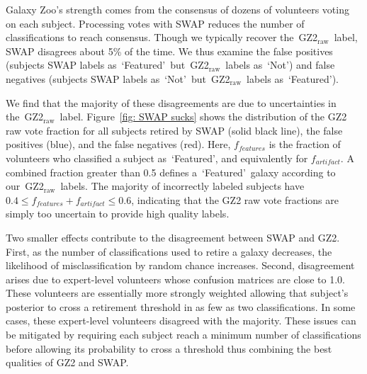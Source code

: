 \documentclass[twocolumn]{aastex6}
\newcommand{\feat}{`Featured'}
\newcommand{\notfeat}{`Not'}
\newcommand{\raw}{GZ2$_{\text{raw}}$}
\begin{document}
Galaxy Zoo's strength comes from the consensus of dozens of volunteers voting on each subject. 
Processing votes with SWAP reduces the number of classifications to reach consensus. 
Though we typically recover the~\raw~label, SWAP disagrees about 5\% of the time. 
We thus examine the false positives (subjects SWAP labels as~\feat~but~\raw~labels as~\notfeat) and false negatives (subjects SWAP labels as~\notfeat~but~\raw~labels as~\feat).


We find that the majority of these disagreements are due to uncertainties in 
the~\raw~label. Figure~\ref{fig: SWAP sucks} shows the distribution of the GZ2 
raw vote fraction for all subjects retired by SWAP (solid black line), the 
false positives (blue), and the false negatives (red).  Here, $f_{features}$ is 
the fraction of volunteers who classified a subject as~\feat, and equivalently for
$f_{artifact}$. A combined fraction greater than 0.5 defines a~\feat~galaxy
according to our~\raw~labels. The majority of incorrectly 
labeled subjects have $0.4 \le f_{features}+f_{artifact} \le 0.6$, indicating that 
the GZ2 raw vote fractions are simply too uncertain to provide high quality labels. 


Two smaller effects contribute to the disagreement between SWAP and GZ2. 
First, as the number of classifications used to retire a galaxy decreases, the 
likelihood of misclassification by random chance increases. 
Second, disagreement arises due to expert-level volunteers whose confusion 
matrices are close to 1.0. These volunteers are essentially more 
strongly weighted allowing that subject's posterior to cross a retirement threshold
in as few as two classifications. In some cases, these expert-level volunteers disagreed 
with the majority. These issues can be mitigated by requiring each subject reach 
a minimum number of classifications before allowing its probability to cross a 
threshold thus combining the best qualities of GZ2 and SWAP. 
\end{document}
